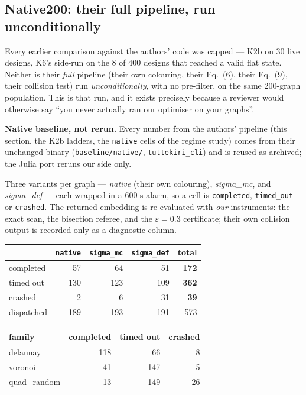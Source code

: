 \documentclass[11pt,a4paper]{article}
\theoremstyle{definition}
\newcommand{\file}[1]{\texttt{\small #1}}
\begin{document}
\subsection{Native200: their full pipeline, run unconditionally}

Every earlier comparison against the authors' code was capped --- K2b on 30 live designs,
K6's side-run on the 8 of 400 designs that reached a valid flat state. Neither is their
\emph{full} pipeline (their own colouring, their Eq.~(6), their Eq.~(9), their collision test)
run \emph{unconditionally}, with no pre-filter, on the same 200-graph population. This is that
run, and it exists precisely because a reviewer would otherwise say ``you never actually ran
our optimiser on your graphs''.

\noindent\textbf{Native baseline, not rerun.} Every number from the authors' pipeline (this section,
the K2b ladders, the \texttt{native} cells of the regime study) comes from their unchanged binary
(\file{baseline/native/}, \file{tuttekiri\_cli}) and is reused as archived; the Julia port reruns
our side only.

Three variants per graph --- \emph{native} (their own colouring), \emph{sigma\_mc}, and
\emph{sigma\_def} --- each wrapped in a 600 s alarm, so a cell is \texttt{completed},
\texttt{timed\_out} or \texttt{crashed}. The returned embedding is re-evaluated with
\emph{our} instruments: the exact scan, the bisection referee, and the $\varepsilon=0.3$
certificate; their own collision output is recorded only as a diagnostic column.

\begin{center}
\small
\begin{tabular}{@{}lrrrr@{}}
\toprule
 & \texttt{native} & \texttt{sigma\_mc} & \texttt{sigma\_def} & total \\
\midrule
completed & 57 & 64 & 51 & \textbf{172} \\
timed out & 130 & 123 & 109 & \textbf{362} \\
crashed & 2 & 6 & 31 & \textbf{39} \\
dispatched & 189 & 193 & 191 & 573 \\
\bottomrule
\end{tabular}
\qquad
\begin{tabular}{@{}lrrr@{}}
\toprule
family & completed & timed out & crashed \\
\midrule
delaunay & 118 & 66 & 8 \\
voronoi & 41 & 147 & 5 \\
quad\_random & 13 & 149 & 26 \\
\bottomrule
\end{tabular}
\end{center}
\end{document}
